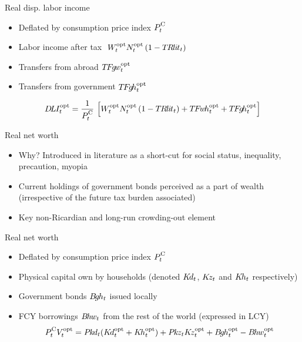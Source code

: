  \begin{frame}{Real disp. labor income}
   \begin{itemize}
    \item Deflated by consumption price index $P^\cc_t$
    \item Labor income after tax $\ W_t^{\text{opt}} N_t^{\text{opt}}\left(1- T\hspace{-0.1em}R\hspace{-0.075em}l\hspace{-0.075em}i\hspace{-0.075em}t_t\right)$
    \item Transfers from abroad $T\hspace{-0.125em}F\hspace{-0.15em}g\hspace{-0.15em}w^{\text{opt}}_t$
    \item Transfers from government $T\hspace{-0.125em}F\hspace{-0.15em}g\hspace{-0.15em}h^{\text{opt}}_t$
  \end{itemize} 
   \vspace{-5mm}
   {\small
   \begin{gather*}
   \DLI_t^\opt  = \frac{1}{P^\cc_t}\,\left[W_t^{\opt} N_t^{\opt}\left(1- \TRlit_t\right) +\TFwh^{\opt}_t + \TFgh^{\opt}_t\right]
   \end{gather*}
   }%
 \end{frame}
 
 \stopframecont
 
 \startframecont  
 
 \begin{frame}{Real net worth}
   \begin{itemize}
     \item Why? Introduced in literature as a short-cut for social status, inequality, precaution, myopia
     \item Current holdings of government bonds perceived as a part of wealth (irrespective of the future tax burden associated)
     \item Key non-Ricardian and long-run crowding-out element
  \end{itemize} 
 \end{frame}
 
 \begin{frame}{Real net worth}
  \vspace{-10mm}
  \begin{itemize}
    \item Deflated by consumption price index $P^\cc_t$
    \item Physical capital own by households (denoted $K\hspace{-0.15em}d_t$, $K\hspace{-0.15em}z_t$ and $K\hspace{-0.15em}h_t$ respectively)
    \item Government bonds $B\hspace{-0.15em}g\hspace{-0.075em}h_t$ issued locally
    \item FCY borrowings $B\hspace{-0.125em}h\hspace{-0.075em}w_t$ from the rest of the world (expressed in LCY)
    \small
    \begin{gather*}
      P^\cc_t V_t^\opt  = \Pkd_t (\Kd_t^{\opt}+\Kh_t^{\opt})+ \Pkz_t \Kz_t^{\opt} +\Bgh_t^{\opt}-\Bhw_t^{\opt}
   \end{gather*}
   \end{itemize} 
 \end{frame}
 
